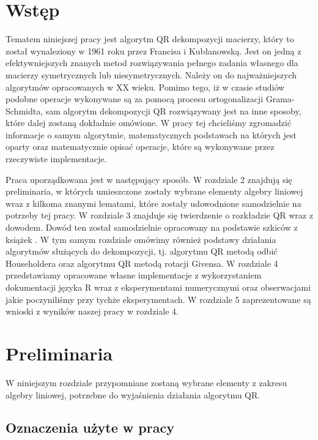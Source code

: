 \documentclass[12pt,a4paper]{report}
\begin{document}
\chapter{Wstęp}
Tematem niniejszej pracy jest algorytm QR dekompozycji macierzy, który to został wynaleziony w 1961 roku przez Francisa i Kubłanowską. Jest on jedną z efektywniejszych znanych metod rozwiązywania pełnego zadania własnego dla macierzy symetrycznych lub niesymetrycznych. Należy on do najważniejszych algorytmów opracowanych w XX wieku. Pomimo tego, iż w czasie studiów podobne operacje wykonywane są za pomocą procesu ortogonalizacji Grama-Schmidta, sam algorytm dekompozycji QR rozwiązywany jest na inne sposoby, które dalej zostaną dokładnie omówione. W pracy tej chcieliśmy zgromadzić informacje o samym algorytmie, matematycznych podstawach na których jest oparty oraz matematycznie opisać operacje, które są wykonywane przez rzeczywiste implementacje.

Praca uporządkowana jest w następujący sposób. W rozdziale 2 znajdują się preliminaria, w których umieszczone zostały wybrane elementy algebry liniowej wraz z kilkoma znanymi lematami, które zostały udowodnione samodzielnie na potrzeby tej pracy. W rozdziale 3 znajduje się twierdzenie o rozkładzie QR wraz z dowodem. Dowód ten został samodzielnie opracowany na podstawie szkiców z książek \citep{bjorck14,demmel12,poreda11,wilkinson13}. W tym samym rozdziale omówimy również podstawy działania algorytmów służących do dekompozycji, tj. algorytmu QR metodą odbić Householdera oraz algorytmu QR metodą rotacji Givensa. W rozdziale 4 przedstawiamy opracowane własne implementacje z wykorzystaniem dokumentacji języka R \citep{dokumentacjaR} wraz z eksperymentami numerycznymi oraz obserwacjami jakie poczyniliśmy przy tychże eksperymentach. W rozdziale 5 zaprezentowane są wnioski z wyników naszej pracy w rozdziale 4. 










\chapter{Preliminaria}

W niniejszym rozdziale przypomniane zostaną wybrane elementy z zakresu algebry liniowej, potrzebne do wyjaśnienia działania algorytmu QR. 
 
\section{Oznaczenia użyte w pracy}
\end{document}
